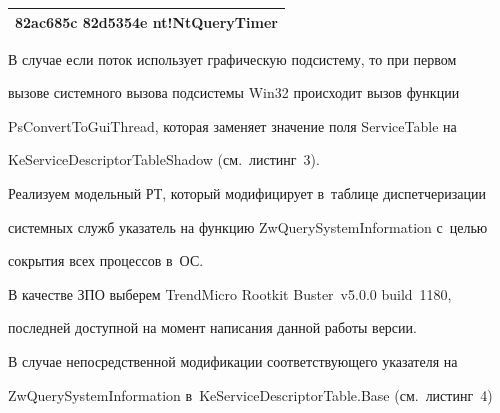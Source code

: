 \begin{table}[b]
\begin{center}
\begin{tabular}{|l|}
{\sf 82ac685c  82d5354e nt!NtQueryTimer}\\


\hline


\end{tabular}








\vspace*{-3pt}





\parbox{274pt}{


}


\end{center}


\end{table}


  


  


  В случае если поток использует графическую подсистему, то при первом 


вызове системного вызова подсистемы Win32 происходит вызов функции 


\mbox{{\sf PsConvertToGuiThread}}, которая заменяет значение поля {\sf ServiceTable} на 


\mbox{{\sf KeServiceDescriptorTableShadow}} (см.\ листинг~3).





  


  Реализуем модельный РТ, который модифицирует в~таблице диспетчеризации 


системных служб указатель на функцию {\sf ZwQuerySystemInformation} с~целью 


сокрытия всех процессов в~ОС.


  


  В качестве ЗПО выберем TrendMicro Rootkit Buster~v5.0.0 build~1180, 


последней доступной на момент написания данной работы версии. 


  


  В случае непосредственной модификации соответствующего указателя на 


{\sf ZwQuerySystemInformation} в~{\sf KeServiceDescriptorTable.Base} (см.\ листинг~4)


